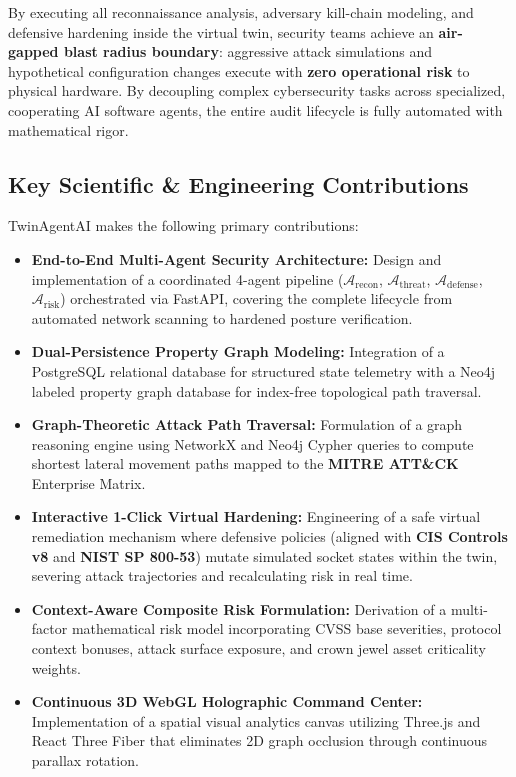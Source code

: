 \documentclass[conference]{IEEEtran}
\begin{document}
By executing all reconnaissance analysis, adversary kill-chain modeling, and defensive hardening inside the virtual twin, security teams achieve an \textbf{air-gapped blast radius boundary}: aggressive attack simulations and hypothetical configuration changes execute with \textbf{zero operational risk} to physical hardware. By decoupling complex cybersecurity tasks across specialized, cooperating AI software agents, the entire audit lifecycle is fully automated with mathematical rigor.

\subsection{Key Scientific \& Engineering Contributions}
TwinAgentAI makes the following primary contributions:
\begin{itemize}
    \item \textbf{End-to-End Multi-Agent Security Architecture:} Design and implementation of a coordinated 4-agent pipeline ($\mathcal{A}_{\text{recon}}$, $\mathcal{A}_{\text{threat}}$, $\mathcal{A}_{\text{defense}}$, $\mathcal{A}_{\text{risk}}$) orchestrated via FastAPI, covering the complete lifecycle from automated network scanning to hardened posture verification.
    \item \textbf{Dual-Persistence Property Graph Modeling:} Integration of a PostgreSQL relational database for structured state telemetry with a Neo4j labeled property graph database for index-free topological path traversal.
    \item \textbf{Graph-Theoretic Attack Path Traversal:} Formulation of a graph reasoning engine using NetworkX and Neo4j Cypher queries to compute shortest lateral movement paths mapped to the \textbf{MITRE ATT\&CK} Enterprise Matrix.
    \item \textbf{Interactive 1-Click Virtual Hardening:} Engineering of a safe virtual remediation mechanism where defensive policies (aligned with \textbf{CIS Controls v8} and \textbf{NIST SP 800-53}) mutate simulated socket states within the twin, severing attack trajectories and recalculating risk in real time.
    \item \textbf{Context-Aware Composite Risk Formulation:} Derivation of a multi-factor mathematical risk model incorporating CVSS base severities, protocol context bonuses, attack surface exposure, and crown jewel asset criticality weights.
    \item \textbf{Continuous 3D WebGL Holographic Command Center:} Implementation of a spatial visual analytics canvas utilizing Three.js and React Three Fiber that eliminates 2D graph occlusion through continuous parallax rotation.
\end{itemize}
\end{document}
